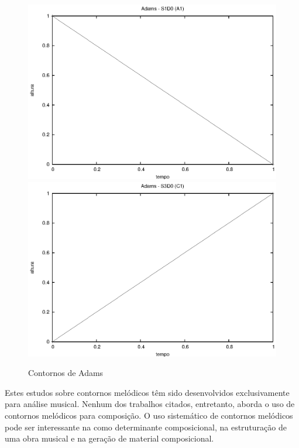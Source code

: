 \documentclass{article}
\begin{document}
\begin{figure}[h]
  \begin{minipage}{1.0\linewidth}
    \includegraphics[scale=.6]{a1}
    \includegraphics[scale=.6]{c1}
    \centering
  \end{minipage}
  \caption{Contornos de Adams}
  \label{fig:adams}
\end{figure}


Estes estudos sobre contornos melódicos têm sido desenvolvidos
exclusivamente para análise musical. Nenhum dos trabalhos citados,
entretanto, aborda o uso de contornos melódicos para composição. O uso
sistemático de contornos melódicos pode ser interessante na como
determinante composicional, na estruturação de uma obra musical e na
geração de material composicional.
\end{document}
